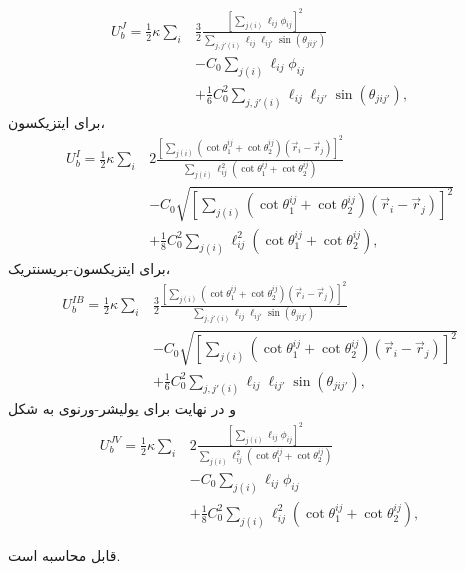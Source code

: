 \begin{equation}
\begin{aligned}
U_b^J=\frac{1}{2}\kappa\sum_i&\frac{3}{2}\frac{\left[\sum_{j(i)}\ell_{ij}\phi_{ij}\right]^2}{\sum_{j,j'(i)}\ell_{ij}\ell_{ij'}\sin(\theta_{jij'})}\\
&-C_0\sum_{j(i)}\ell_{ij}\phi_{ij}\\
&+\frac{1}{6}C_0^2\sum_{j,j'(i)}\ell_{ij}\ell_{ij'}\sin(\theta_{jij'}),
\end{aligned}
\end{equation}
برای ایتزیکسون،
\begin{equation}
\begin{aligned}
U_b^I=\frac{1}{2}\kappa\sum_i&2\frac{\left[\sum_{j(i)}(\cot\theta_1^{ij}+\cot\theta_2^{ij})(\vec r_i-\vec r_j)\right]^2}{\sum_{j(i)}\ell_{ij}^2(\cot\theta_1^{ij}+\cot\theta_2^{ij})}\\
&-C_0\sqrt{\left[\sum_{j(i)}(\cot\theta_1^{ij}+\cot\theta_2^{ij})(\vec r_i-\vec r_j)\right]^2}\\
&+\frac{1}{8}C_0^2\sum_{j(i)}\ell_{ij}^2(\cot\theta_1^{ij}+\cot\theta_2^{ij}),
\end{aligned}
\end{equation}
برای ایتزیکسون-بریسنتریک،
\begin{equation}
\begin{aligned}
U_b^{IB}=\frac{1}{2}\kappa\sum_i&\frac{3}{2}\frac{\left[\sum_{j(i)}(\cot\theta_1^{ij}+\cot\theta_2^{ij})(\vec r_i-\vec r_j)\right]^2}{\sum_{j,j'(i)}\ell_{ij}\ell_{ij'}\sin(\theta_{jij'})}\\
&-C_0\sqrt{\left[\sum_{j(i)}(\cot\theta_1^{ij}+\cot\theta_2^{ij})(\vec r_i-\vec r_j)\right]^2}\\
&+\frac{1}{6}C_0^2\sum_{j,j'(i)}\ell_{ij}\ell_{ij'}\sin(\theta_{jij'}),
\end{aligned}
\end{equation}
و در نهایت برای یولیشر-ورنوی به شکل
\begin{equation}
\begin{aligned}
U_b^{JV}=\frac{1}{2}\kappa\sum_i&2\frac{\left[\sum_{j(i)}\ell_{ij}\phi_{ij}\right]^2}{\sum_{j(i)}\ell_{ij}^2(\cot\theta_1^{ij}+\cot\theta_2^{ij})}\\
&-C_0\sum_{j(i)}\ell_{ij}\phi_{ij}\\
&+\frac{1}{8}C_0^2\sum_{j(i)}\ell_{ij}^2(\cot\theta_1^{ij}+\cot\theta_2^{ij}),
\end{aligned}
\end{equation}

قابل محاسبه‌ است.


